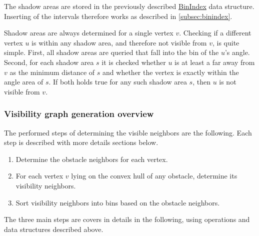 			The shadow areas are stored in the previously described \hyperref[subsec:binindex]{BinIndex} data structure.
			Inserting of the intervals therefore works as described in \cref{subsec:binindex}.
			
			Shadow areas are always determined for a single vertex $v$.
			Checking if a different vertex $u$ is within any shadow area, and therefore not visible from $v$, is quite simple.
			First, all shadow areas are queried that fall into the bin of the $u$'s angle.
			Second, for each shadow area $s$ it is checked whether $u$ is at least a far away from $v$ as the minimum distance of $s$ and whether the vertex is exactly within the angle area of $s$.
			If both holds true for any such shadow area $s$, then $u$ is not visible from $v$.
		
		\subsubsection{Visibility graph generation overview}
		
			The performed steps of determining the visible neighbors are the following.
			Each step is described with more details sections below.
			\begin{enumerate}[leftmargin=2.25em+\widthof{2.},label={2.\arabic*.}]
				\item Determine the obstacle neighbors for each vertex.
				\item For each vertex $v$ lying on the convex hull of any obstacle, determine its visibility neighbors.
				\item Sort visibility neighbors into bins based on the obstacle neighbors.
			\end{enumerate}
			The three main steps are covers in details in the following, using operations and data structures described above.
		

